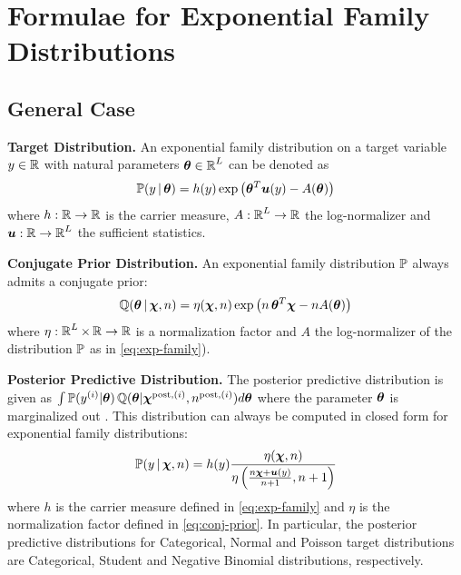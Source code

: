 \section{Formulae for Exponential Family Distributions}
\label{sec:formulae}

\subsection{General Case}

\textbf{Target Distribution.} An exponential family distribution on a target variable $y \in \operatorname{\mathbb{R}}$ with natural parameters $\bm{\theta} \in \operatorname{\mathbb{R}}^L$ can be denoted as
%
\begin{equation} \label{eq:exp-family}
    \mathbb{P}(y \,|\, \bm{\theta}) = h(y) \exp\left(\bm{\theta}^T \bm{u}(y) - A(\bm{\theta})\right)
\end{equation}
%
where ${h: \operatorname{\mathbb{R}} \rightarrow \operatorname{\mathbb{R}}}$ is the carrier measure, ${A: \operatorname{\mathbb{R}}^L \rightarrow \operatorname{\mathbb{R}}}$ the log-normalizer and ${\bm{u}: \operatorname{\mathbb{R}} \rightarrow \operatorname{\mathbb{R}}^L}$ the sufficient statistics.

\textbf{Conjugate Prior Distribution.} An exponential family distribution $\mathbb{P}$ always admits a conjugate prior:
%
\begin{equation}\label{eq:conj-prior}
    \operatorname{\mathbb{Q}}(\bm{\theta} \,|\, \bm{\chi}, n) = \eta(\bm{\chi}, n) \exp\left( n \, \bm{\theta}^T\bm{\chi}  - n A(\bm{\theta}) \right)
\end{equation}
%
where $\eta : \operatorname{\mathbb{R}}^L \times \operatorname{\mathbb{R}} \rightarrow \operatorname{\mathbb{R}}$ is a normalization factor and $A$ the log-normalizer of the distribution $\mathbb{P}$ as in \cref{eq:exp-family}).

\textbf{Posterior Predictive Distribution.} The posterior predictive distribution is given as $\int \mathbb{P}(y^{(i)}|\bm{\theta})\operatorname{\mathbb{Q}}(\bm{\theta}|\bm{\chi}^{\text{post}, (i)}, n^{\text{post}, (i)}) d\bm{\theta}$ where the parameter $\bm{\theta}$ is marginalized out  \citep{uncertainty-deep-learning}. This distribution can always be computed in closed form for exponential family distributions:
%
\begin{align}
\mathbb{P}(y \,|\, \bm{\chi}, n) = h(y) \frac{\eta(\bm{\chi}, n)}{\eta\left(\frac{n \bm{\chi} + \bm{u}(y)}{n +1}, n + 1 \right)}
\end{align}
%
where $h$ is the carrier measure defined in \cref{eq:exp-family} and $\eta$ is the normalization factor defined in \cref{eq:conj-prior}. In particular, the posterior predictive distributions for Categorical, Normal and Poisson target distributions are Categorical, Student and Negative Binomial distributions, respectively.

